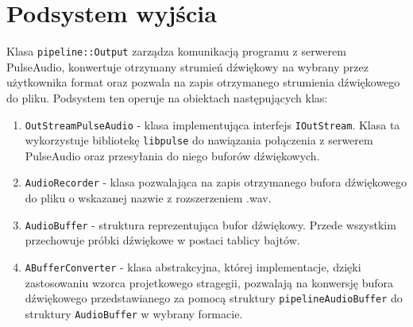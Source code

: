 \section{Podsystem wyjścia}
Klasa \texttt{pipeline::Output} zarządza komunikacją programu z serwerem PulseAudio, konwertuje otrzymany strumień dźwiękowy na wybrany przez użytkownika format oraz pozwala na zapis otrzymanego strumienia dźwiękowego do pliku. Podsystem ten operuje na obiektach następujących klas:
\begin{enumerate}
    \item \texttt{OutStreamPulseAudio} - klasa implementująca interfejs \texttt{IOutStream}. Klasa ta wykorzystuje bibliotekę \texttt{libpulse} do nawiązania połączenia z serwerem PulseAudio oraz przesyłania do niego buforów dźwiękowych.
    \item \texttt{AudioRecorder} - klasa pozwalająca na zapis otrzymanego bufora dźwiękowego do pliku o wskazanej nazwie z rozszerzeniem .wav.
    \item \texttt{AudioBuffer} - struktura reprezentująca bufor dźwiękowy. Przede wszystkim przechowuje próbki dźwiękowe w postaci tablicy bajtów.
    \item \texttt{ABufferConverter} - klasa abstrakcyjna, której implementacje, dzięki zastosowaniu wzorca projetkowego stragegii, pozwalają na konwersję bufora dźwiękowego przedstawianego za pomocą struktury \texttt{pipelineAudioBuffer} do struktury \texttt{AudioBuffer} w wybrany formacie. 
\end{enumerate}


